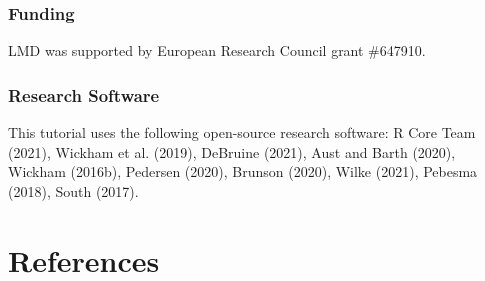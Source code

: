 \documentclass[
  english,
  doc,floatsintext]{apa6}
\begin{document}
\hypertarget{funding}{%
\subsubsection{Funding}\label{funding}}

LMD was supported by European Research Council grant \#647910.

\hypertarget{research-software}{%
\subsubsection{Research Software}\label{research-software}}

This tutorial uses the following open-source research software: R Core Team (2021), Wickham et al. (2019), DeBruine (2021), Aust and Barth (2020), Wickham (2016b), Pedersen (2020), Brunson (2020), Wilke (2021), Pebesma (2018), South (2017).

\newpage

\hypertarget{references}{%
\section{References}\label{references}}

\begingroup
\setlength{\parindent}{-0.5in}
\setlength{\leftskip}{0.5in}
\end{document}
